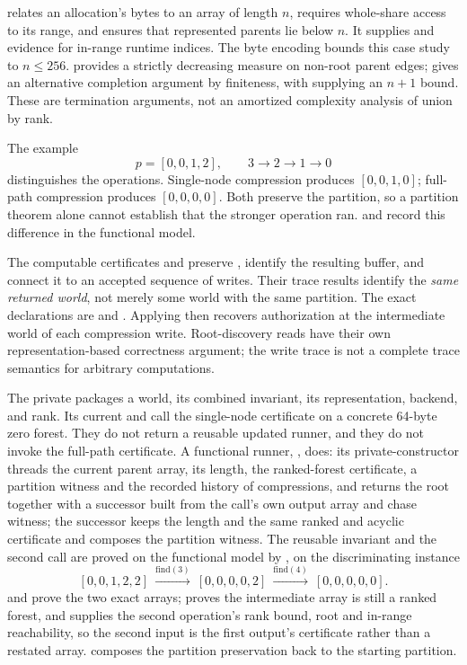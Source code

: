 \documentclass[a4paper,UKenglish,cleveref]{lipics-v2021}
\begin{document}
 relates an allocation's bytes to an array of length $n$, requires
whole-share access to its range, and ensures that represented parents lie below
$n$. It supplies  and  evidence for in-range
runtime indices. The byte encoding bounds this case study to $n\leq256$.
 provides a strictly decreasing measure on non-root parent edges;
 gives an alternative completion argument by finiteness, with
 supplying an $n+1$ bound. These are termination
arguments, not an amortized complexity analysis of union by rank.

The example
\[
 p=[0,0,1,2],\qquad 3\to2\to1\to0
\]
distinguishes the operations. Single-node compression produces $[0,0,1,0]$;
full-path compression produces $[0,0,0,0]$. Both preserve the partition, so a
partition theorem alone cannot establish that the stronger operation ran.
 and  record this
difference in the functional model.

The computable certificates  and
 preserve , identify the resulting
buffer, and connect it to an accepted sequence of writes. Their trace results
identify the \emph{same returned world}, not merely some world with the same
partition. The exact declarations are
 and
. Applying
 then recovers authorization at the intermediate
world of each compression write. Root-discovery reads have their own
representation-based correctness argument; the write trace is not a complete
trace semantics for arbitrary  computations.

The private  packages a world, its combined invariant, its
representation, backend, and rank. Its current  and
 call the single-node certificate on a concrete
64-byte zero forest. They do not return a reusable updated runner, and they do
not invoke the full-path certificate. A functional runner,
, does: its private-constructor 
threads the current parent array, its length, the ranked-forest certificate, a
partition witness and the recorded history of compressions, and
 returns the root together with a successor built from the
call's own output array and chase witness; the successor keeps the length and the
same ranked and acyclic certificate and composes the partition witness. The
reusable invariant and the second call
are proved on the functional model by , on the
discriminating instance
\[
 [0,0,1,2,2]\ \xrightarrow{\mathrm{find}(3)}\ [0,0,0,0,2]
 \ \xrightarrow{\mathrm{find}(4)}\ [0,0,0,0,0].
\]
 and  prove the two exact arrays;
 proves the intermediate array is still a ranked forest,
and  supplies the second operation's rank bound,
root and in-range reachability, so the second input is the first output's
certificate rather than a restated array. 
composes the partition preservation back to the starting partition.
\end{document}
